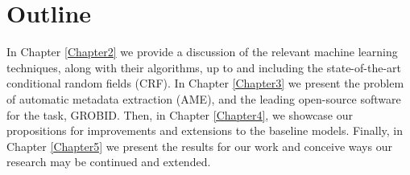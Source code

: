 \section{Outline}

In Chapter \ref{Chapter2} we provide a discussion of the relevant machine learning techniques, along with their algorithms, up to and including the state-of-the-art conditional random fields (CRF). In Chapter \ref{Chapter3} we present the problem of automatic metadata extraction (AME), and the leading open-source software for the task, GROBID. Then, in Chapter \ref{Chapter4}, we showcase our propositions for improvements and extensions to the baseline models. Finally, in Chapter \ref{Chapter5} we present the results for our work and conceive ways our research may be continued and extended.